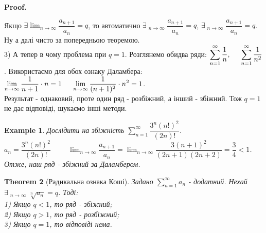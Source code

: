 \documentclass[a4paper, 10pt]{article}
\makeatletter
\DeclareMathOperator*\uplim{\overline{lim}}
\DeclareMathOperator*\downlim{\underline{lim}}
\def\huge{\displaystyle}
\def\qed{$\blacksquare$}
\theoremstyle{theoremdd}
\newtheorem{theorem}{Theorem}[subsection]
\theoremstyle{theoremdd}
\theoremstyle{theoremdd}
\theoremstyle{theoremdd}
\theoremstyle{theoremdd}
\newtheorem{example}[theorem]{Example}
\theoremstyle{theoremdd}
\theoremstyle{theoremdd}
\theoremstyle{theoremdd}
\theoremstyle{theoremdd}
\renewenvironment{proof}[1][Proof.\\]{\par
\pushQED{\hfill \qed}%
\normalfont \topsep6\p@\@plus6\p@\relax
\trivlist
\item\relax
{\bfseries
#1\@addpunct{.}}\hspace\labelsep\ignorespaces
}{%
\popQED\endtrivlist\@endpefalse
}
\makeatother
\begin{document}
\begin{proof}
Якщо $\exists \huge\lim_{n \to \infty} \dfrac{a_{n+1}}{a_n} = q$, то автоматично $\exists \huge\uplim_{n \to \infty} \dfrac{a_{n+1}}{a_n} = q$, $\exists \huge\downlim_{n \to \infty} \dfrac{a_{n+1}}{a_n} = q$. Ну а далі чисто за попередньою теоремою.
\bigskip \\
3) А тепер в чому проблема при $q = 1$. Розглянемо обидва ряди: $\huge \sum_{n=1}^\infty \dfrac{1}{n}, \hspace{0.5cm} \sum_{n=1}^\infty \dfrac{1}{n^2}$.
Використаємо для обох ознаку Даламбера:\\
$\huge \lim_{n \to \infty} \dfrac{1}{n+1} \cdot n = 1 \hspace{0.5cm} \lim_{n \to \infty} \dfrac{1}{(n+1)^2} \cdot n^2 = 1$.\\
Результат - однаковий, проте один ряд - розбіжний, а інший - збіжний. Тож $q = 1$ не дає відповіді, шукаємо інші методи.
\end{proof}

\begin{example}
Дослідити на збіжність $\huge\sum_{n=1}^\infty \dfrac{3^n (n!)^2}{(2n)!}$.\\
$a_n = \dfrac{3^n (n!)^2}{(2n)!} \hspace{1cm} \huge\lim_{n \to \infty} \dfrac{a_{n+1}}{a_n} = \lim_{n \to \infty} \dfrac{3 (n+1)^2}{(2n+1)(2n+2)} = \dfrac{3}{4} < 1$.\\
Отже, наш ряд - збіжний за Даламбером.
\end{example}

\begin{theorem}[Радикальна ознака Коші]
Задано $\huge \sum_{n=1}^{\infty} a_n$ - додатний. Нехай $\exists \huge \uplim_{n \to \infty} \sqrt[n]{a_n} = q$. Тоді:\\
1) Якщо $q<1$, то ряд - збіжний;\\
2) Якщо $q>1$, то ряд - розбіжний;\\
3) Якщо $q=1$, то відповіді нема.
\end{theorem}
\end{document}
